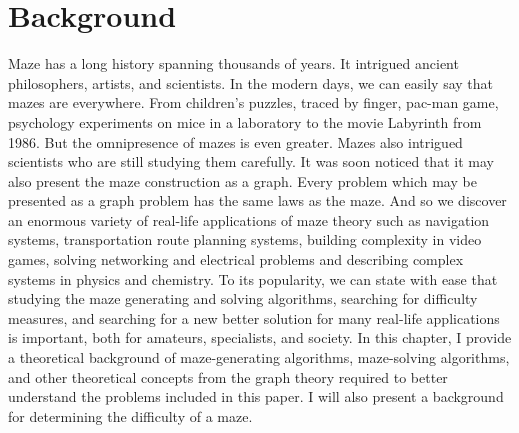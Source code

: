 \chapter{Background}\label{cha:background}
Maze has a long history spanning thousands of years. It intrigued ancient philosophers, artists, and scientists. In the modern days, we can easily say that mazes are everywhere.
From children's puzzles, traced by finger, pac-man game, psychology experiments on mice in a laboratory to the movie Labyrinth from 1986. But the omnipresence of mazes is even greater. 
Mazes also intrigued scientists who are still studying them carefully. It was soon noticed that it may also present the maze construction as a graph. Every problem which may be presented as a graph problem has the same laws as the maze. And so we discover an enormous variety of real-life applications of maze theory such as navigation systems, transportation route planning systems, building complexity in video games, solving networking and electrical problems and describing complex systems in physics and chemistry.
To its popularity, we can state with ease that studying the maze generating and solving algorithms, searching for difficulty measures, and searching for a new better solution for many real-life applications is important, both for amateurs, specialists, and society. In this chapter, I provide a theoretical background of maze-generating algorithms, maze-solving algorithms, and other theoretical concepts from the graph theory required to better understand the problems included in this paper. I will also present a background for determining the difficulty of a maze. 
